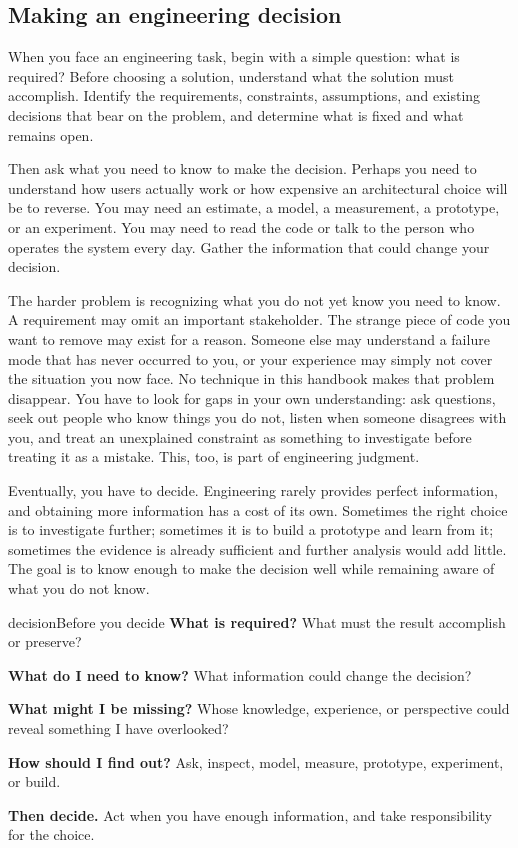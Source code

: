 \subsection{Making an engineering decision}\label{sec-making-a-decision}

When you face an engineering task, begin with a simple question: what is required? Before choosing
a solution, understand what the solution must accomplish. Identify the requirements, constraints,
assumptions, and existing decisions that bear on the problem, and determine what is fixed and what
remains open.

Then ask what you need to know to make the decision. Perhaps you need to understand how users
actually work or how expensive an architectural choice will be to reverse. You may need an
estimate, a model, a measurement, a prototype, or an experiment. You may need to read the code or
talk to the person who operates the system every day. Gather the information that could change
your decision.

The harder problem is recognizing what you do not yet know you need to know. A requirement may
omit an important stakeholder. The strange piece of code you want to remove may exist for a
reason. Someone else may understand a failure mode that has never occurred to you, or your
experience may simply not cover the situation you now face. No technique in this handbook makes
that problem disappear. You have to look for gaps in your own understanding: ask questions, seek
out people who know things you do not, listen when someone disagrees with you, and treat an
unexplained constraint as something to investigate before treating it as a mistake. This, too, is
part of engineering judgment.

Eventually, you have to decide. Engineering rarely provides perfect information, and obtaining more
information has a cost of its own. Sometimes the right choice is to investigate further; sometimes
it is to build a prototype and learn from it; sometimes the evidence is already sufficient and
further analysis would add little. The goal is to know enough to make the decision well while
remaining aware of what you do not know.

\begin{bookbox}{decision}{Before you decide} %
\textbf{What is required?} What must the result accomplish or preserve?

\textbf{What do I need to know?} What information could change the decision?

\textbf{What might I be missing?} Whose knowledge, experience, or perspective could reveal something I
have overlooked?

\textbf{How should I find out?} Ask, inspect, model, measure, prototype, experiment, or build.

\textbf{Then decide.} Act when you have enough information, and take responsibility for the choice.
\end{bookbox}

